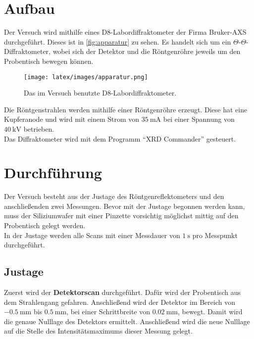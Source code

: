 \section{Aufbau}

    \noindent Der Versuch wird mithilfe eines D8-Labordiffraktometer der Firma Bruker-AXS durchgeführt. Dieses ist in \autoref{fig:apparatur}
    zu sehen. Es handelt sich um ein $\Theta$-$\Theta$-Diffraktometer, wobei sich der Detektor und die Röntgenröhre jeweils um den 
    Probentisch bewegen können. 
    \begin{figure}
        \centering
        \texttt{[image: latex/images/apparatur.png]}
        \caption{Das im Versuch benutzte D8-Labordiffraktometer. }
        \label{fig:apparatur}
    \end{figure}
    Die Röntgenstrahlen werden mithilfe einer Röntgenröhre erzeugt. Diese hat eine Kupferanode und wird mit einem Strom von $\SI{35}{\milli\ampere}$ 
    bei einer Spannung von $\SI{40}{\kilo\volt}$ betrieben. \\
    Das Diffraktometer wird mit dem Programm \enquote{XRD Commander} gesteuert. 

\section{Durchführung}

    \noindent 
    Der Versuch besteht aus der  Justage des Röntgenreflektometers und den anschließenden zwei Messungen.
    Bevor mit der Justage begonnen werden kann, muss der Siliziumwafer mit einer Pinzette vorsichtig möglichst mittig auf den Probentisch gelegt werden. \\
    In der Justage werden alle Scans mit einer Messdauer von $\SI{1}{\second}$ pro Messpunkt durchgeführt.


    \subsection{Justage}

        \noindent Zuerst wird der \textbf{Detektorscan} durchgeführt. Dafür wird der Probentisch aus dem Strahlengang gefahren. Anschließend 
        wird der Detektor im Bereich von $\SI{-0.5}{\milli\metre}$ bis $\SI{0.5}{\milli\metre}$, bei einer Schrittbreite von $\SI{0.02}{\milli\metre} $, bewegt. 
        Damit wird die genaue Nulllage des Detektors ermittelt. Anschließend wird die neue Nulllage auf die Stelle des Intensitätsmaximums 
        dieser Messung gelegt. \\

